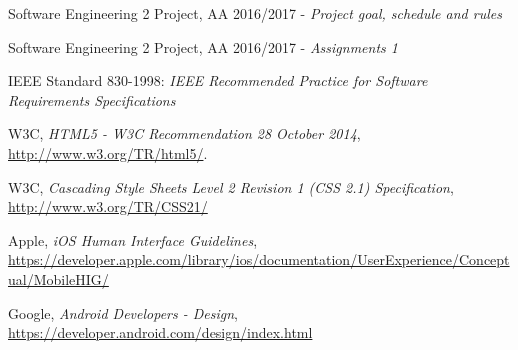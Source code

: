 \begin{thebibliography}{1}	
	Software Engineering 2 Project, AA 2016/2017 - \emph{Project goal, schedule and rules}
	
	Software Engineering 2 Project, AA 2016/2017 - \emph{Assignments 1}
	
	IEEE Standard 830-1998: \emph{IEEE Recommended Practice for Software Requirements Specifications}
	
	W3C, \emph{HTML5 - W3C Recommendation 28 October 2014}, \url{http://www.w3.org/TR/html5/}.
	
	W3C, \emph{Cascading Style Sheets Level 2 Revision 1 (CSS 2.1) Specification}, \url{http://www.w3.org/TR/CSS21/}
	
	Apple, \emph{iOS Human Interface Guidelines}, \url{https://developer.apple.com/library/ios/documentation/UserExperience/Conceptual/MobileHIG/}
	
	Google, \emph{Android Developers - Design}, \url{https://developer.android.com/design/index.html}
\end{thebibliography}